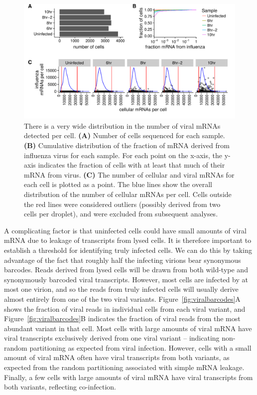 \documentclass[9pt,lineno]{elife}
\begin{document}
\begin{figure}
\centerline{\includegraphics[width=0.9\linewidth]{figures/p_cell_mRNA_summary.pdf}}
\caption{\label{fig:cells}
There is a very wide distribution in the number of viral mRNAs detected per cell.
{\bf (A)} 
Number of cells sequenced for each sample.
{\bf (B)} 
Cumulative distribution of the fraction of mRNA derived from influenza virus for each sample.
For each point on the x-axis, the y-axis indicates the fraction of cells with at least that much of their mRNA from virus.
{\bf (C)} 
The number of cellular and viral mRNAs for each cell is plotted as a point.
The blue lines show the overall distribution of the number of cellular mRNAs per cell.
Cells outside the red lines were considered outliers (possibly derived from two cells per droplet), and were excluded from subsequent analyses.
}
\end{figure}

A complicating factor is that uninfected cells could have small amounts of viral mRNA due to leakage of transcripts from lysed cells.
It is therefore important to establish a threshold for identifying truly infected cells.
We can do this by taking advantage of the fact that roughly half the infecting virions bear synonymous barcodes.
Reads derived from lysed cells will be drawn from both wild-type and synonymously barcoded viral transcripts.
However, most cells are infected by at most one virion, and so the reads from truly infected cells will usually derive almost entirely from one of the two viral variants. 
Figure~\ref{fig:viralbarcodes}A shows the fraction of viral reads in individual cells from each viral variant, and Figure~\ref{fig:viralbarcodes}B indicates the fraction of viral reads from the most abundant variant in that cell.
Most cells with large amounts of viral mRNA have viral transcripts exclusively derived from one viral variant -- indicating non-random partitioning as expected from viral infection.
However, cells with a small amount of viral mRNA often have viral transcripts from both variants, as expected from the random partitioning associated with simple mRNA leakage.
Finally, a few cells with large amounts of viral mRNA have viral transcripts from both variants, reflecting co-infection.
\end{document}
